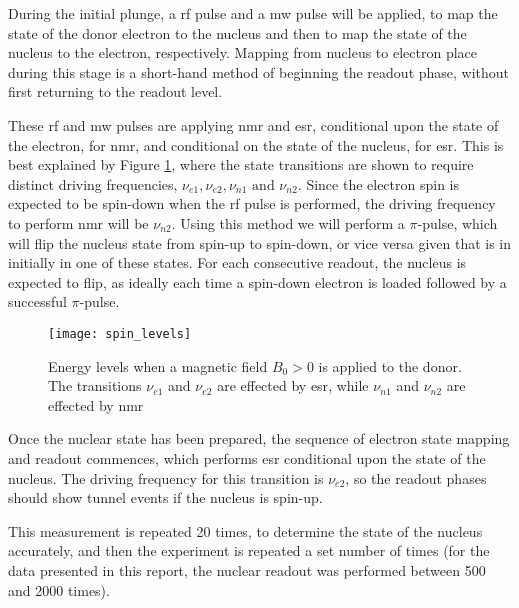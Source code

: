		During the initial plunge, a \gls{rf} pulse and a \gls{mw} pulse will be applied, to map the state of the donor electron to the nucleus and then to map the state of the nucleus to the electron, respectively. Mapping from nucleus to electron place during this stage is a short-hand method of beginning the readout phase, without first returning to the readout level.
		
		These \gls{rf} and \gls{mw} pulses are applying \gls{nmr} and \gls{esr}, conditional upon the state of the electron, for \gls{nmr}, and conditional on the state of the nucleus, for \gls{esr}. This is best explained by Figure \ref{fig::spin_levels}, where the state transitions are shown to require distinct driving frequencies, $\nu_{e1}, \nu_{e2}, \nu_{n1} \textrm{ and } \nu_{n2}$. Since the electron spin is expected to be spin-down when the \gls{rf} pulse is performed, the driving frequency to perform \gls{nmr} will be $\nu_{n2}$. Using this method we will perform a $\pi$-pulse, which will flip the nucleus state from spin-up to spin-down, or vice versa given that is in initially in one of these states. For each consecutive readout, the nucleus is expected to flip, as ideally each time a spin-down electron is loaded followed by a successful $\pi$-pulse.
		
		\begin{figure}[htbp]
			\centering
			\texttt{[image: spin\_levels]}
			\caption[Energy levels of a $^{31}$P and electron spin system under magnetic bias.]{Energy levels when a magnetic field $B_0 > 0$ is applied to the donor. The transitions $\nu_{e1}$ and $\nu_{e2}$ are effected by \gls{esr}, while $\nu_{n1}$ and $\nu_{n2}$ are effected by \gls{nmr}} 
			\label{fig::spin_levels}
		\end{figure}
		
		Once the nuclear state has been prepared, the sequence of electron state mapping and readout commences, which performs \gls{esr} conditional upon the state of the nucleus. The driving frequency for this transition is $\nu_{e2}$, so the readout phases should show tunnel events if the nucleus is spin-up.
	
		This measurement is repeated 20 times, to determine the state of the nucleus accurately, and then the experiment is repeated a set number of times (for the data presented in this report, the nuclear readout was performed between 500 and 2000 times). 
		
